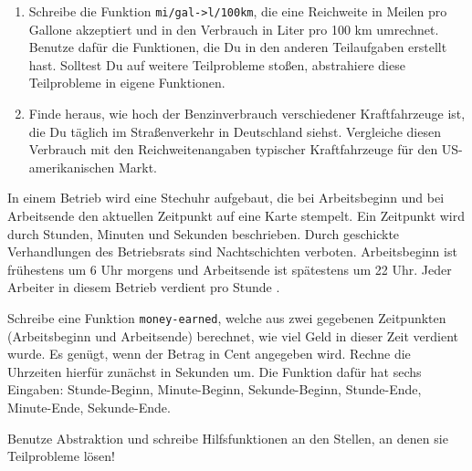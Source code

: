 \begin{aufgabe}
\begin{enumerate}
  \item Schreibe die Funktion
    \lstinline{mi/gal->l/100km}, die eine Reichweite in Meilen pro
    Gallone akzeptiert und in den Verbrauch in Liter pro 100 km
    umrechnet.  Benutze dafür die Funktionen, die Du in den
    anderen Teilaufgaben erstellt hast.  Solltest Du auf weitere
    Teilprobleme stoßen, abstrahiere diese Teilprobleme in eigene
    Funktionen.

  \item Finde heraus, wie hoch der Benzinverbrauch
    verschiedener Kraftfahrzeuge ist, die Du täglich im
    Straßenverkehr in Deutschland siehst.  Vergleiche diesen
    Verbrauch mit den Reichweitenangaben typischer Kraftfahrzeuge für
    den US-amerikanischen Markt.
  \end{enumerate}

\end{aufgabe}

\begin{aufgabe}
In einem Betrieb wird eine Stechuhr aufgebaut, 
die bei Arbeitsbeginn und bei Arbeitsende den aktuellen Zeitpunkt
auf eine Karte stempelt. Ein Zeitpunkt wird durch Stunden, Minuten 
und Sekunden beschrieben. Durch geschickte Verhandlungen des Betriebsrats
sind Nachtschichten verboten. Arbeitsbeginn ist frühestens um 6 Uhr morgens
und Arbeitsende ist spätestens um 22 Uhr. Jeder Arbeiter in diesem Betrieb verdient
pro Stunde .

Schreibe eine Funktion \lstinline{money-earned}, welche aus zwei
gegebenen Zeitpunkten (Arbeitsbeginn und Arbeitsende) berechnet,
wie viel Geld in dieser Zeit verdient wurde. Es genügt, wenn der Betrag
in Cent angegeben wird.  Rechne die Uhrzeiten hierfür zunächst in
Sekunden um. Die Funktion dafür hat sechs Eingaben: Stunde-Beginn,
Minute-Beginn, Sekunde-Beginn, Stunde-Ende, Minute-Ende, Sekunde-Ende.

Benutze Abstraktion und schreibe Hilfsfunktionen an den Stellen, an
denen sie Teilprobleme lösen!
\end{aufgabe}






